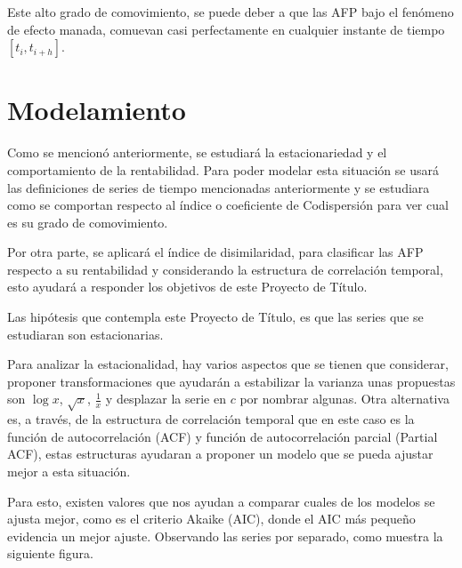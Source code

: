 Este alto grado de comovimiento, se puede deber a que las AFP bajo el fen\'omeno de efecto manada, comuevan casi perfectamente en cualquier instante de tiempo $[t_i,t_{i+h}]$.

\section{Modelamiento}

Como se mencion\'o anteriormente, se estudiar\'a la estacionariedad y el comportamiento de la rentabilidad. Para poder modelar esta situaci\'on se usar\'a las definiciones de series de tiempo mencionadas anteriormente y se estudiara como se comportan respecto al \'indice o coeficiente de Codispersi\'on para ver cual es su grado de comovimiento.

Por otra parte, se aplicar\'a el \'indice de disimilaridad, para clasificar las AFP respecto a su rentabilidad y considerando la estructura de correlaci\'on temporal, esto ayudar\'a a responder los objetivos de este Proyecto de T\'itulo.

Las hip\'otesis que contempla este Proyecto de T\'itulo, es que las series que se estudiaran son estacionarias.

Para analizar la estacionalidad, hay varios aspectos que se tienen que considerar, proponer transformaciones que ayudar\'an a estabilizar la varianza unas propuestas son $\log{x}$, $\sqrt{x}$, $\frac{1}{x}$ y desplazar la serie en $c$ por nombrar algunas. Otra alternativa es, a trav\'es, de la estructura de correlaci\'on temporal que en este caso es la funci\'on de autocorrelaci\'on (ACF) y funci\'on de autocorrelaci\'on parcial (Partial ACF), estas estructuras ayudaran a proponer un modelo que se pueda ajustar mejor a esta situaci\'on.

Para esto, existen valores que nos ayudan a comparar cuales de los modelos se ajusta mejor, como es el criterio Akaike (AIC), donde el AIC m\'as peque\~{n}o evidencia un mejor ajuste. Observando las series por separado, como muestra la siguiente figura.


